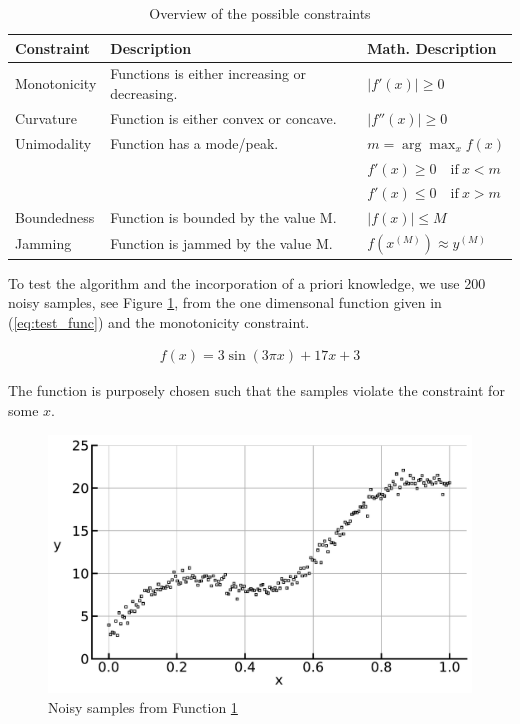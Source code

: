 \documentclass[10pt,a4paper]{article}
\begin{document}
	\begin{table}[h]
	\centering
	\begin{tabular}{|lll|}
		\hline
		\textbf{Constraint}& \textbf{Description}                         & \textbf{Math. Description}\\ \hline \toprule
		Monotonicity       & Functions is either increasing or decreasing.& $\lvert f'(x) \rvert \ge 0$ 	\\ \hline
		Curvature          & Function is either convex or concave.        & $\lvert f''(x) \rvert \ge 0$ 	\\ \hline
		Unimodality        & Function has a mode/peak.                    & $m = \arg \max_{x} f(x)$ 				\\ 
						   &	   										  & $f'(x) \ge 0 \quad \text{if} \ x < m$  \\ 
						   &  											  & $f'(x) \le 0 \quad \text{if} \ x > m$  \\ \hline
		Boundedness        & Function is bounded by the value M.          & $\lvert f(x)\rvert \le M$ 		\\ \hline
		Jamming            & Function is jammed by the value M.           & $f(x^{(M)}) \approx y^{(M)}$	\\ \hline \bottomrule
	\end{tabular}
	\caption{Overview of the possible constraints}
	\label{tab:constraint_overview}
	\end{table}
		
	To test the algorithm and the incorporation of a priori knowledge, we use 200 noisy samples, see Figure \ref{fig:test_func}, from the one dimensonal function given in (\ref{eq:test_func}) and the monotonicity constraint. 
	
	\begin{align}\label{eq:test_func}
	f(x) = 3\sin(3\pi x) + 17x + 3
	\end{align}
	
	The function is purposely chosen such that the samples violate the constraint for some $x$. 
	
	\begin{figure}[H]
		\centering
		\includegraphics[width=\columnwidth]{../thesisplots/test_func.pdf}
		\caption{Noisy samples from Function \ref{fig:test_func}}
		\label{fig:test_func}
	\end{figure}
\end{document}
